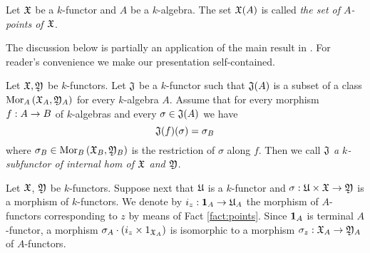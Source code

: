 \begin{definition}
Let ${\mathfrak X}$ be a $k$-functor and $A$ be a $k$-algebra. The set ${\mathfrak X}(A)$ is called \textit{the set of $A$-points of ${\mathfrak X}$}.
\end{definition}
\noindent
The discussion below is partially an application of the main result in {\cite[section 6]{Presheaves}}. For reader's convenience we make our presentation self-contained.

\begin{definition}
Let ${\mathfrak X}, {\mathfrak Y}$ be $k$-functors. Let ${\mathfrak J}$ be a $k$-functor such that ${\mathfrak J}(A)$ is a subset of a class $\mathrm{Mor}_A\left({\mathfrak X}_A,{\mathfrak Y}_A\right)$ for every $k$-algebra $A$. Assume that for every morphism $f:A\rightarrow B$ of $k$-algebras and every $\sigma\in {\mathfrak J}(A)$ we have
$${\mathfrak J}(f)(\sigma) = \sigma_B$$
where $\sigma_B\in \mathrm{Mor}_B\left({\mathfrak X}_B,{\mathfrak Y}_B\right)$ is the restriction of $\sigma$ along $f$. Then we call ${\mathfrak J}$ \textit{a $k$-subfunctor of internal hom of ${\mathfrak X}$ and ${\mathfrak Y}$}.
\end{definition}
\noindent
Let ${\mathfrak X}$, ${\mathfrak Y}$ be $k$-functors. Suppose next that ${\mathfrak U}$ is a $k$-functor and $\sigma:{\mathfrak U}\times {\mathfrak X}\rightarrow {\mathfrak Y}$ is a morphism of $k$-functors. We denote by $i_z:\mathbf{1}_A\rightarrow {\mathfrak U}_A$ the morphism of $A$-functors corresponding to $z$ by means of Fact \ref{fact:points}. Since $\mathbf{1}_A$ is terminal $A$-functor, a morphism $\sigma_A\cdot \left(i_z\times 1_{{\mathfrak X}_A}\right)$ is isomorphic to a morphism $\sigma_z:{\mathfrak X}_A\rightarrow {\mathfrak Y}_A$ of $A$-functors.

